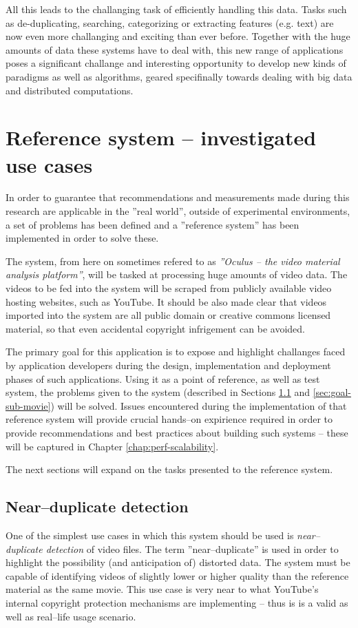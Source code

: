 All this leads to the challanging task of efficiently handling this data. Tasks such as de-duplicating, searching, categorizing or extracting features (e.g. text) are now even more challanging and exciting than ever before. Together with the huge amounts of data these systems have to deal with, this new range of applications poses a significant challange and interesting opportunity to develop new kinds of paradigms as well as algorithms, geared specifinally towards dealing with big data and distributed computations.


\section{Reference system -- investigated use cases}
\label{sec:ref-system}

In order to guarantee that recommendations and measurements made during this research are applicable in the ''real world'', outside of experimental environments, a set of problems has been defined and a ''reference system'' has been implemented in order to solve these.

The system, from here on sometimes refered to as \textit{''Oculus -- the video material analysis platform''}, will be tasked at processing huge amounts of video data. The videos to be fed into the system will be scraped from publicly available video hosting websites, such as YouTube. It should be also made clear that videos imported into the system are all public domain or creative commons licensed material, so that even accidental copyright infrigement can be avoided.

The primary goal for this application is to expose and highlight challanges faced by application developers during the design, implementation and deployment phases of such applications. Using it as a point of reference, as well as test system, the problems given to the system (described in Sections \ref{sec:goal-near-dup} and \ref{sec:goal-sub-movie}) will be solved. Issues encountered during the implementation of that reference system will provide crucial hands--on expirience required in order to provide recommendations and best practices about building such systems -- these will be captured in Chapter \ref{chap:perf-scalability}.

The next sections will expand on the tasks presented to the reference system.


\subsection{Near--duplicate detection}
\label{sec:goal-near-dup}
One of the simplest use cases in which this system should be used is \textit{near--duplicate detection} of video files. The term ''near--duplicate'' is used in order to highlight the possibility (and anticipation of) distorted data. The system must be capable of identifying videos of slightly lower or higher quality than the reference material as the same movie. This use case is very near to what YouTube's \cite{youtube} internal copyright protection mechanisms are implementing -- thus is is a valid as well as real--life usage scenario.

